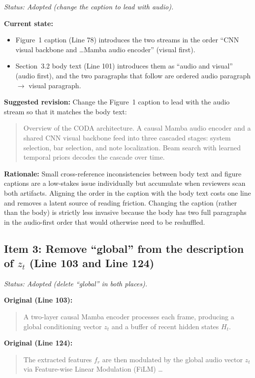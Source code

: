 \documentclass{article}
\begin{document}
\textit{Status: Adopted (change the caption to lead with audio).}

\textbf{Current state:}
\begin{itemize}
    \item Figure~1 caption (Line 78) introduces the two streams in the order ``CNN visual backbone and \ldots Mamba audio encoder'' (visual first).
    \item Section~3.2 body text (Line 101) introduces them as ``audio and visual'' (audio first), and the two paragraphs that follow are ordered audio paragraph $\to$ visual paragraph.
\end{itemize}

\textbf{Suggested revision:}
Change the Figure~1 caption to lead with the audio stream so that it matches the body text:
\begin{quote}
Overview of the CODA architecture. A causal Mamba audio encoder and a shared CNN visual backbone feed into three cascaded stages: system selection, bar selection, and note localization. Beam search with learned temporal priors decodes the cascade over time.
\end{quote}

\textbf{Rationale:}
Small cross-reference inconsistencies between body text and figure captions are a low-stakes issue individually but accumulate when reviewers scan both artifacts. Aligning the order in the caption with the body text costs one line and removes a latent source of reading friction. Changing the caption (rather than the body) is strictly less invasive because the body has two full paragraphs in the audio-first order that would otherwise need to be reshuffled.

\subsection*{Item 3: Remove ``global'' from the description of $z_t$ (Line 103 and Line 124)}

\textit{Status: Adopted (delete ``global'' in both places).}

\textbf{Original (Line 103):}
\begin{quote}
A two-layer causal Mamba encoder processes each frame, producing a global conditioning vector $z_t$ and a buffer of recent hidden states $H_t$.
\end{quote}

\textbf{Original (Line 124):}
\begin{quote}
The extracted features $f_r$ are then modulated by the global audio vector $z_t$ via Feature-wise Linear Modulation (FiLM) \ldots
\end{quote}
\end{document}
